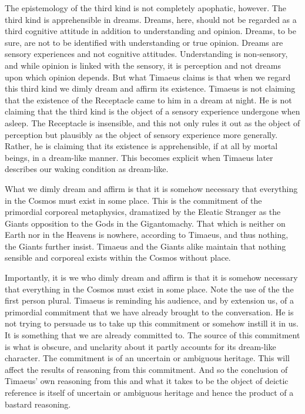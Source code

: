 The epistemology of the third kind is not completely apophatic, however. The third kind is apprehensible in dreams. Dreams, here, should not be regarded as a third cognitive attitude in addition to understanding and opinion. Dreams, to be sure, are not to be identified with understanding or true opinion. Dreams are sensory experiences and not cognitive attitudes. Understanding is non-sensory, and while opinion is linked with the sensory, it is perception and not dreams upon which opinion depends. But what Timaeus claims is that when we regard this third kind we dimly dream and affirm its existence. Timaeus is not claiming that the existence of the Receptacle came to him in a dream at night. He is not claiming that the third kind is the object of a sensory experience undergone when asleep. The Receptacle is insensible, and this not only rules it out as the object of perception but plausibly as the object of sensory experience more generally. Rather, he is claiming that its existence is apprehensible, if at all by mortal beings, in a dream-like manner. This becomes explicit when Timaeus later describes our waking condition as dream-like.

What we dimly dream and affirm is that it is somehow necessary that everything in the Cosmos must exist in some place. This is the commitment of the primordial corporeal metaphysics, dramatized by the Eleatic Stranger as the Giants opposition to the Gods in the Gigantomachy. That which is neither on Earth nor in the Heavens is nowhere, according to Timaeus, and thus nothing, the Giants further insist. Timaeus and the Giants alike maintain that nothing sensible and corporeal exists within the Cosmos without place. 

Importantly, it is we who dimly dream and affirm is that it is somehow necessary that everything in the Cosmos must exist in some place. Note the use of the the first person plural. Timaeus is reminding his audience, and by extension us, of a primordial commitment that we have already brought to the conversation. He is not trying to persuade us to take up this commitment or somehow instill it in us. It is something that we are already committed to. The source of this commitment is what is obscure, and unclarity about it partly accounts for its dream-like character. The commitment is of an uncertain or ambiguous heritage. This will affect the results of reasoning from this commitment. And so the conclusion of Timaeus' own reasoning from this and what it takes to be the object of deictic reference is itself of uncertain or ambiguous heritage and hence the product of a bastard reasoning.

